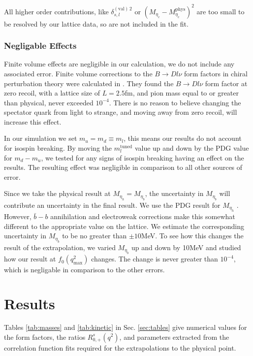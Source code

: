 All higher order contributions, like $\delta^{(\text{val})\,2}_{s,l}$ or $(M_{\eta_c}-M_{\eta_c}^{\text{phys}})^2$ are too small to be resolved by our lattice data, so are not included in the fit.

\subsubsection{Negligable Effects}

Finite volume effects are negligible in our calculation, we do not include any associated error. Finite volume corrections to the $B\to Dl\nu$ form factors in chiral perturbation theory were calculated in \cite{Laiho:2005ue}. They found the $B\to Dl\nu$ form factor at zero recoil, with a lattice size of $L=2.5$fm, and pion mass equal to or greater than physical, never exceeded $10^{-4}$. There is no reason to believe changing the spectator quark from light to strange, and moving away from zero recoil, will increase this effect.

In our simulation we set $m_u=m_d\equiv m_l$, this means our results do not account for isospin breaking. By moving the $m_l^{\text{tuned}}$ value up and down by the PDG value for $m_d-m_u$, we tested for any signs of isospin breaking having an effect on the results. The resulting effect was negligible in comparison to all other sources of error.

Since we take the physical result at $M_{\eta_h}=M_{\eta_b}$, the uncertainty in $M_{\eta_b}$ will contribute an uncertainty in the final result. We use the PDG result for $M_{\eta_h}$ \cite{PhysRevD.98.030001}. However, $\bar{b}-b$ annihilation and electroweak corrections make this somewhat different to the appropriate value on the lattice. We estimate the corresponding uncertainty in $M_{\eta_b}$ to be no greater than $\pm10$MeV. To see how this changes the result of the extrapolation, we varied $M_{\eta_b}$ up and down by 10MeV and studied how our result at $f_0(q^2_{\text{max}})$ changes. The change is never greater than $10^{-4}$, which is negligable in comparison to the other errors.

\section{Results}
\label{sec:results}

Tables \ref{tab:masses} and \ref{tab:kinetic} in Sec. \ref{sec:tables} give numerical values for the form factors, the ratios $R_{0,+}^s(q^2)$, and parameters extracted from the correlation function fits required for the extrapolations to the physical point.

